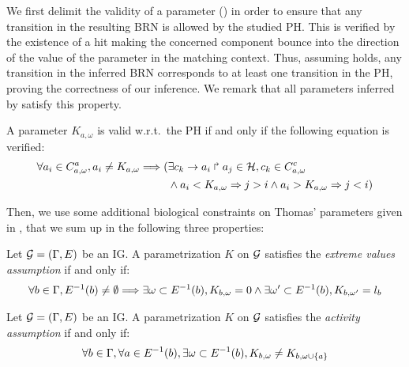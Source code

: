 We first delimit the validity of a parameter () in order to ensure that any
transition in the resulting BRN is allowed by the studied PH.
This is verified by the existence of a hit making the concerned component bounce into the direction
of the value of the parameter in the matching context.
Thus, assuming  holds, any transition in the inferred BRN corresponds to at least
one transition in the PH, proving the correctness of our inference.
%
We remark that all parameters inferred by  satisfy this property.

\begin{property}\label{pro:K-valid}
A parameter $K_{a,\omega}$ is valid w.r.t.~the PH if and only if the following equation is verified:
\begin{align*}
  \forall a_i \in C^a_{a,\omega}, a_i \neq K_{a,\omega} \Longrightarrow
    (& \exists c_k\rightarrow a_i\Rsh a_j\in\mathcal{H}, c_k \in C^c_{a,\omega} \\
     & \wedge a_i < K_{a,\omega} \Rightarrow j > i \wedge  a_i > K_{a,\omega} \Rightarrow j <i )
\end{align*}
\end{property}

Then, we use some additional biological constraints on Thomas' parameters given in
\cite{BernotSemBRN}, that we sum up in the following three properties:

\begin{property}
\label{pro:param_enum_extreme}
Let $\mathcal{G} = (\Gamma, E)$ be an IG. A parametrization $K$ on $\mathcal{G}$ satisfies the \emph{extreme values assumption} if and only if:
\begin{align*}
  \forall b \in \Gamma, E^{-1}(b) \neq \emptyset \Longrightarrow
    \exists \omega \subset E^{-1}(b), K_{b,\omega} = 0 \wedge
    \exists \omega' \subset E^{-1}(b), K_{b,\omega'} = l_b
\end{align*}
\end{property}

\begin{property}
\label{pro:param_enum_activity}
Let $\mathcal{G} = (\Gamma, E)$ be an IG. A parametrization $K$ on $\mathcal{G}$ satisfies the \emph{activity assumption} if and only if:
\begin{align*}
  \forall b \in \Gamma, \forall a \in E^{-1}(b), \exists \omega \subset E^{-1}(b), K_{b,\omega} \neq K_{b,\omega \cup \{ a \}}
\end{align*}
\end{property}

